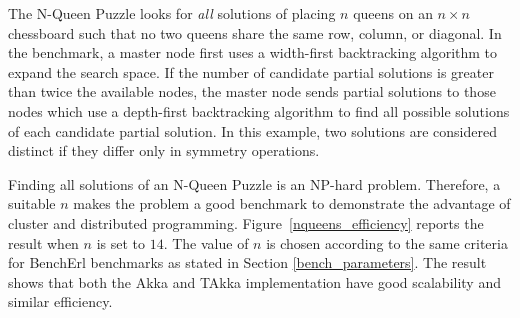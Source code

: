 The N-Queen Puzzle \citep{wiki:nqueens} looks for {\it all} solutions of 
placing $n$ queens on an $n \times n$ chessboard such that no two queens share 
the same row, column, or diagonal.  In the benchmark, a master node first uses 
a width-first backtracking algorithm to expand the search space.  If the 
number of candidate partial solutions is greater than twice the available 
nodes, the master node sends partial solutions to those nodes which use a 
depth-first backtracking algorithm to find all possible solutions of each 
candidate partial solution. In this example, two solutions are considered 
distinct if they differ only in symmetry operations.

Finding all solutions of an N-Queen Puzzle is an NP-hard problem.  Therefore, a 
suitable $n$ makes the problem a good benchmark to demonstrate the advantage of 
cluster and distributed programming.  Figure~\ref{nqueens_efficiency}
reports the result when $n$ is set to $14$.  The value of $n$ is chosen 
according to the same criteria for BenchErl benchmarks as stated in Section 
\ref{bench_parameters}.  The result shows that both the Akka and 
TAkka implementation have good scalability and similar efficiency.


